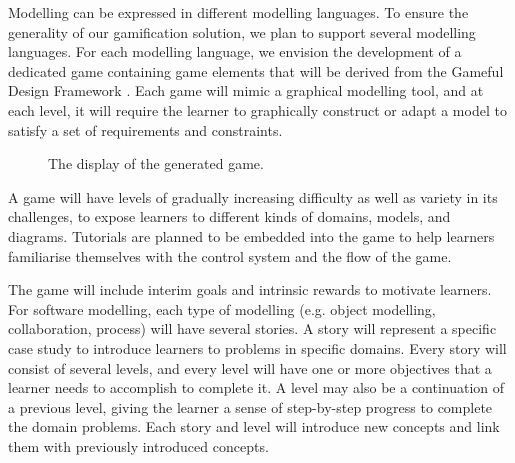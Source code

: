 \documentclass[12pt, a4paper]{report}
\begin{document}
{Modelling can be expressed in different modelling languages. To ensure the generality of our gamification solution, we plan to support several modelling languages. For each modelling language, we envision the development of a dedicated game containing game elements that will be derived from the Gameful Design Framework \cite{deterding2015lens}. Each game will mimic a graphical modelling tool, and at each level, it will require the learner to graphically construct or adapt a model to satisfy a set of requirements and constraints.

\begin{figure}[ht]
\centering
{}
\caption{The display of the generated game.}
\label{fig:001}
\end{figure}

A game will have levels of gradually increasing difficulty as well as variety in its challenges, to expose learners to different kinds of domains, models, and diagrams. Tutorials are planned to be embedded into the game to help learners familiarise themselves with the control system and the flow of the game. 

The game will include interim goals and intrinsic rewards to motivate learners. For software modelling, each type of modelling (e.g. object modelling, collaboration, process) will have several stories. A story will represent a specific case study to introduce learners to problems in specific domains. Every story will consist of several levels, and every level will have one or more objectives that a learner needs to accomplish to complete it. A level may also be a continuation of a previous level, giving the learner a sense of step-by-step progress to complete the domain problems. Each story and level will introduce new concepts and link them with previously introduced concepts.

}
\end{document}
